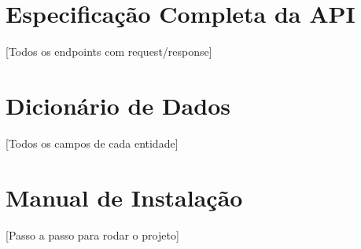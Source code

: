 \begin{apendicesenv}

\chapter{Especificação Completa da API}
\label{appendix:api-spec}
[Todos os endpoints com request/response]

\chapter{Dicionário de Dados}
\label{appendix:data-dictionary}
[Todos os campos de cada entidade]

\chapter{Manual de Instalação}
\label{appendix:install}
[Passo a passo para rodar o projeto]

\end{apendicesenv}